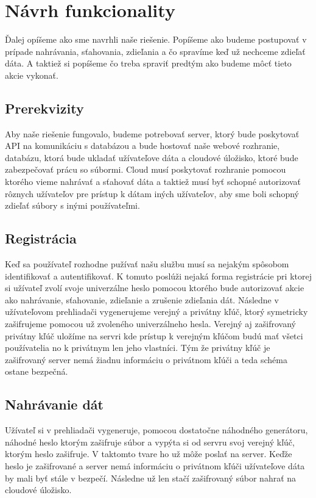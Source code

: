 \chapter{Návrh funkcionality}
	Ďalej opíšeme ako sme navrhli naše riešenie. Popíšeme ako budeme postupovať v prípade nahrávania, sťahovania, zdieľania a čo spravíme keď už nechceme zdieľať dáta. A taktiež si popíšeme čo treba spraviť predtým ako budeme môcť tieto akcie vykonať.
	
	\section{Prerekvizity}
	
		Aby naše riešenie fungovalo, budeme potrebovať server, ktorý bude poskytovať API na komunikáciu s databázou a bude hostovať naše webové rozhranie, databázu, ktorá bude ukladať užívateľove dáta a cloudové úložisko, ktoré bude zabezpečovať prácu so súbormi. Cloud musí poskytovať rozhranie pomocou ktorého vieme nahrávať a sťahovať dáta a taktiež musí byť schopné autorizovať rôznych užívateľov pre prístup k dátam iných užívateľov, aby sme boli schopný zdieľať súbory s inými používateľmi. 
		
	\section{Registrácia}
		
		Keď sa používateľ rozhodne pužívať našu službu musí sa nejakým spôsobom identifikovať a autentifikovať. K tomuto poslúži nejaká forma registrácie pri ktorej si užívateľ zvolí svoje univerzálne heslo pomocou ktorého bude autorizovať akcie ako nahrávanie, sťahovanie, zdieľanie a zrušenie zdieľania dát. Následne v užívateľovom prehliadači vygenerujeme verejný a privátny kľúč, ktorý symetricky zašifrujeme pomocou už zvoleného univerzálneho hesla. Verejný aj zašifrovaný privátny kľúč uložíme na servri kde prístup k verejným kľúčom budú mať všetci používatelia no k privátnym len jeho vlastníci. Tým že privátny kľúč je zašifrovaný server nemá žiadnu informáciu o privátnom kľúči a teda schéma ostane bezpečná.
	
	\section{Nahrávanie dát}
	
		Užívateľ si v prehliadači vygeneruje, pomocou dostatočne náhodného generátoru, náhodné heslo ktorým zašifruje súbor a vypýta si od servru svoj verejný kľúč, ktorým heslo zašifruje. V taktomto tvare ho už môže poslať na server. Keďže heslo je zašifrované a server nemá informáciu o privátnom kľúči užívateľove dáta by mali byť stále v bezpečí. Následne už len stačí zašifrovaný súbor nahrať na cloudové úložisko.
		

